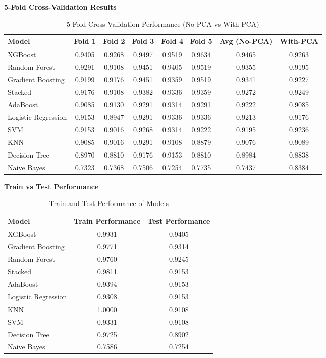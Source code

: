 \documentclass[11pt]{article}
\begin{document}
\vspace{1.8cm}
\textbf{5-Fold Cross-Validation Results}
\begin{table}[H]
\centering
\caption{5-Fold Cross-Validation Performance (No-PCA vs With-PCA)}
\begin{tabular}{|l|c|c|c|c|c|c|c|} 
\hline
\textbf{Model} & \textbf{Fold 1} & \textbf{Fold 2} & \textbf{Fold 3} & \textbf{Fold 4} & \textbf{Fold 5} & \textbf{Avg (No-PCA)} & \textbf{With-PCA} \\
\hline
XGBoost             & 0.9405 & 0.9268 & 0.9497 & 0.9519 & 0.9634 & 0.9465 & 0.9263 \\
Random Forest       & 0.9291 & 0.9108 & 0.9451 & 0.9405 & 0.9519 & 0.9355 & 0.9195 \\
Gradient Boosting   & 0.9199 & 0.9176 & 0.9451 & 0.9359 & 0.9519 & 0.9341 & 0.9227 \\
Stacked             & 0.9176 & 0.9108 & 0.9382 & 0.9336 & 0.9359 & 0.9272 & 0.9249 \\
AdaBoost            & 0.9085 & 0.9130 & 0.9291 & 0.9314 & 0.9291 & 0.9222 & 0.9085 \\
Logistic Regression & 0.9153 & 0.8947 & 0.9291 & 0.9336 & 0.9336 & 0.9213 & 0.9176 \\
SVM                 & 0.9153 & 0.9016 & 0.9268 & 0.9314 & 0.9222 & 0.9195 & 0.9236 \\
KNN                 & 0.9085 & 0.9016 & 0.9291 & 0.9108 & 0.8879 & 0.9076 & 0.9089 \\
Decision Tree       & 0.8970 & 0.8810 & 0.9176 & 0.9153 & 0.8810 & 0.8984 & 0.8838 \\
Naive Bayes         & 0.7323 & 0.7368 & 0.7506 & 0.7254 & 0.7735 & 0.7437 & 0.8384 \\
\hline
\end{tabular}
\end{table}

\vspace{3.0cm}
\textbf{Train vs Test Performance}
\begin{table}[H]
\centering
\caption{Train and Test Performance of Models}
\begin{tabular}{|l|c|c|} 
\hline
\textbf{Model} & \textbf{Train Performance} & \textbf{Test Performance} \\
\hline
XGBoost             & 0.9931 & 0.9405 \\
Gradient Boosting   & 0.9771 & 0.9314 \\
Random Forest       & 0.9760 & 0.9245 \\
Stacked             & 0.9811 & 0.9153 \\
AdaBoost            & 0.9394 & 0.9153 \\
Logistic Regression & 0.9308 & 0.9153 \\
KNN                 & 1.0000 & 0.9108 \\
SVM                 & 0.9331 & 0.9108 \\
Decision Tree       & 0.9725 & 0.8902 \\
Naive Bayes         & 0.7586 & 0.7254 \\
\hline
\end{tabular}
\end{table}
\end{document}

